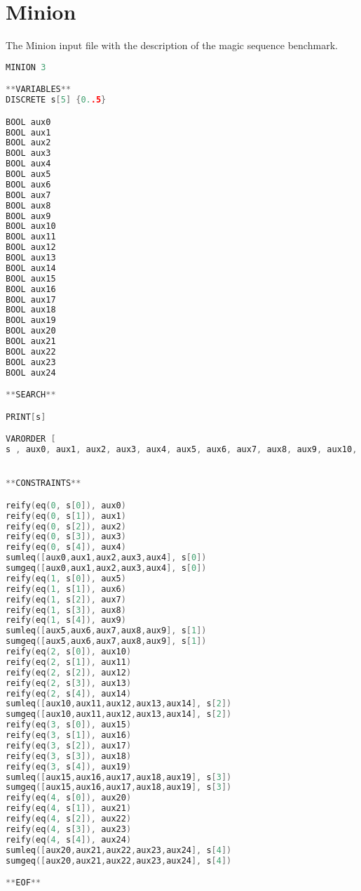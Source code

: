 \section{Minion}
\label{implementation:minion}

The Minion input file with the description of the magic sequence benchmark. 

\begin{lstlisting}[language=C++]
MINION 3

**VARIABLES**
DISCRETE s[5] {0..5}

BOOL aux0
BOOL aux1
BOOL aux2
BOOL aux3
BOOL aux4
BOOL aux5
BOOL aux6
BOOL aux7
BOOL aux8
BOOL aux9
BOOL aux10
BOOL aux11
BOOL aux12
BOOL aux13
BOOL aux14
BOOL aux15
BOOL aux16
BOOL aux17
BOOL aux18
BOOL aux19
BOOL aux20
BOOL aux21
BOOL aux22
BOOL aux23
BOOL aux24

**SEARCH**

PRINT[s]

VARORDER [
s , aux0, aux1, aux2, aux3, aux4, aux5, aux6, aux7, aux8, aux9, aux10, aux11, aux12, aux13, aux14, aux15, aux16, aux17, aux18, aux19, aux20, aux21, aux22, aux23, aux24]


**CONSTRAINTS**

reify(eq(0, s[0]), aux0)
reify(eq(0, s[1]), aux1)
reify(eq(0, s[2]), aux2)
reify(eq(0, s[3]), aux3)
reify(eq(0, s[4]), aux4)
sumleq([aux0,aux1,aux2,aux3,aux4], s[0])
sumgeq([aux0,aux1,aux2,aux3,aux4], s[0])
reify(eq(1, s[0]), aux5)
reify(eq(1, s[1]), aux6)
reify(eq(1, s[2]), aux7)
reify(eq(1, s[3]), aux8)
reify(eq(1, s[4]), aux9)
sumleq([aux5,aux6,aux7,aux8,aux9], s[1])
sumgeq([aux5,aux6,aux7,aux8,aux9], s[1])
reify(eq(2, s[0]), aux10)
reify(eq(2, s[1]), aux11)
reify(eq(2, s[2]), aux12)
reify(eq(2, s[3]), aux13)
reify(eq(2, s[4]), aux14)
sumleq([aux10,aux11,aux12,aux13,aux14], s[2])
sumgeq([aux10,aux11,aux12,aux13,aux14], s[2])
reify(eq(3, s[0]), aux15)
reify(eq(3, s[1]), aux16)
reify(eq(3, s[2]), aux17)
reify(eq(3, s[3]), aux18)
reify(eq(3, s[4]), aux19)
sumleq([aux15,aux16,aux17,aux18,aux19], s[3])
sumgeq([aux15,aux16,aux17,aux18,aux19], s[3])
reify(eq(4, s[0]), aux20)
reify(eq(4, s[1]), aux21)
reify(eq(4, s[2]), aux22)
reify(eq(4, s[3]), aux23)
reify(eq(4, s[4]), aux24)
sumleq([aux20,aux21,aux22,aux23,aux24], s[4])
sumgeq([aux20,aux21,aux22,aux23,aux24], s[4])

**EOF**
\end{lstlisting}
